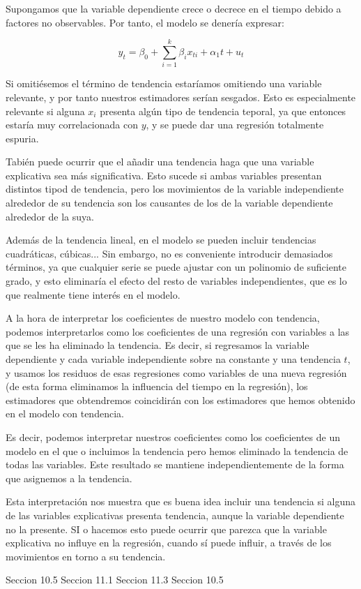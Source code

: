 Supongamos que la variable dependiente crece o decrece en el tiempo debido a factores no observables. Por tanto, el modelo se dener\'ia expresar:

\[y_t=\beta_0+\sum_{i=1}^{k}\beta_ix_{ti}+\alpha_1t+u_t\]

Si omiti\'esemos el t\'ermino de tendencia estar\'iamos omitiendo una variable relevante, y por tanto nuestros estimadores ser\'ian sesgados. Esto es especialmente relevante si alguna $x_i$ presenta alg\'un tipo de tendencia teporal, ya que entonces estar\'ia muy correlacionada con $y$, y se puede dar una regresi\'on totalmente espuria.

Tabi\'en puede ocurrir que el a\~nadir una tendencia haga que una variable explicativa sea m\'as significativa. Esto sucede si ambas variables presentan distintos tipod de tendencia, pero los movimientos de la variable independiente alrededor de su tendencia son los causantes de los de la variable dependiente alrededor de la suya.

Adem\'as de la tendencia lineal, en el modelo se pueden incluir tendencias cuadr\'aticas, c\'ubicas... Sin embargo, no es conveniente introducir demasiados t\'erminos, ya que cualquier serie se puede ajustar con un polinomio de suficiente grado, y esto eliminar\'ia el efecto del resto de variables independientes, que es lo que realmente tiene inter\'es en el modelo.


A la hora de interpretar los coeficientes de nuestro modelo con tendencia, podemos interpretarlos como los coeficientes de una regresi\'on con variables a las que se les ha eliminado la tendencia. Es decir, si regresamos la variable dependiente y cada variable independiente sobre na constante y una tendencia $t$, y usamos los residuos de esas regresiones como variables de una nueva regresi\'on (de esta forma eliminamos la influencia del tiempo en la regresi\'on), los estimadores que obtendremos coincidir\'an con los estimadores que hemos obtenido en el modelo con tendencia.

Es decir, podemos interpretar nuestros coeficientes como los coeficientes de un modelo en el que o incluimos la tendencia pero hemos eliminado la tendencia de todas las variables. Este resultado se mantiene independientemente de la forma que asignemos a la tendencia.

Esta interpretaci\'on nos muestra que es buena idea incluir una tendencia si alguna de las variables explicativas presenta tendencia, aunque la variable dependiente no la presente. SI o hacemos esto puede ocurrir que parezca que la variable explicativa no influye en la regresi\'on, cuando s\'i puede influir, a trav\'es de los movimientos en torno a su tendencia.





Seccion 10.5
Seccion 11.1
Seccion 11.3
Seccion 10.5
